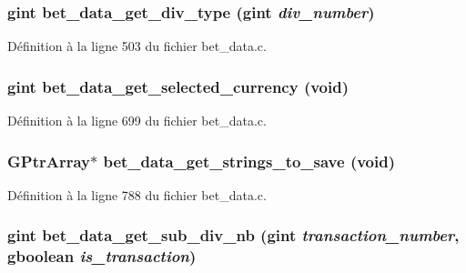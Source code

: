 \subsubsection[{bet\_\-data\_\-get\_\-div\_\-type}]{\setlength{\rightskip}{0pt plus 5cm}gint bet\_\-data\_\-get\_\-div\_\-type (gint {\em div\_\-number})}\label{bet__data_8h_ae1629f0fcd2e8027d1b9a07d99efbf1d}


Définition à la ligne 503 du fichier bet\_\-data.c.

\subsubsection[{bet\_\-data\_\-get\_\-selected\_\-currency}]{\setlength{\rightskip}{0pt plus 5cm}gint bet\_\-data\_\-get\_\-selected\_\-currency (void)}\label{bet__data_8h_a276706a60495ceea4d9b6ce0794888e9}


Définition à la ligne 699 du fichier bet\_\-data.c.

\subsubsection[{bet\_\-data\_\-get\_\-strings\_\-to\_\-save}]{\setlength{\rightskip}{0pt plus 5cm}GPtrArray$\ast$ bet\_\-data\_\-get\_\-strings\_\-to\_\-save (void)}\label{bet__data_8h_a4185b5667139f402a298806bb53a211a}


Définition à la ligne 788 du fichier bet\_\-data.c.

\subsubsection[{bet\_\-data\_\-get\_\-sub\_\-div\_\-nb}]{\setlength{\rightskip}{0pt plus 5cm}gint bet\_\-data\_\-get\_\-sub\_\-div\_\-nb (gint {\em transaction\_\-number}, \/  gboolean {\em is\_\-transaction})}\label{bet__data_8h_a92ceecac038add334e75ef1c12f7a666}


